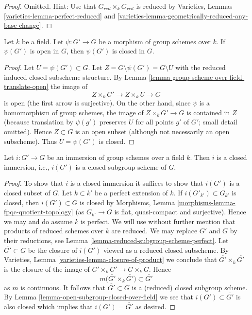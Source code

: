 \begin{proof}
Omitted. Hint: Use that $G_{red} \times_k G_{red}$ is reduced by
Varieties, Lemmas \ref{varieties-lemma-perfect-reduced} and
\ref{varieties-lemma-geometrically-reduced-any-base-change}.
\end{proof}

\begin{lemma}
\label{lemma-open-subgroup-closed-over-field}
Let $k$ be a field. Let $\psi : G' \to G$ be a morphism of group schemes
over $k$. If $\psi(G')$ is open in $G$, then $\psi(G')$ is closed in $G$.
\end{lemma}

\begin{proof}
Let $U = \psi(G') \subset G$. Let $Z = G \setminus \psi(G') = G \setminus U$
with the reduced induced closed subscheme structure. By
Lemma \ref{lemma-group-scheme-over-field-translate-open}
the image of
$$
Z \times_k G' \longrightarrow
Z \times_k U \longrightarrow G
$$
is open (the first arrow is surjective). On the other hand, since $\psi$
is a homomorphism of group schemes, the image of $Z \times_k G' \to G$
is contained in $Z$ (because translation by $\psi(g')$ preserves
$U$ for all points $g'$ of $G'$; small detail omitted).
Hence $Z \subset G$ is an open subset (although not
necessarily an open subscheme). Thus $U = \psi(G')$ is closed.
\end{proof}

\begin{lemma}
\label{lemma-immersion-group-schemes-closed-over-field}
Let $i : G' \to G$ be an immersion of group schemes over a field $k$.
Then $i$ is a closed immersion, i.e., $i(G')$ is a closed subgroup scheme
of $G$.
\end{lemma}

\begin{proof}
To show that $i$ is a closed immersion it suffices to show that
$i(G')$ is a closed subset of $G$. Let $k \subset k'$ be a perfect
extension of $k$. If $i(G'_{k'}) \subset G_{k'}$ is closed, then
$i(G') \subset G$ is closed by
Morphisms, Lemma \ref{morphisms-lemma-fpqc-quotient-topology}
(as $G_{k'} \to G$ is flat, quasi-compact and surjective).
Hence we may and do assume $k$ is perfect. We will use without further
mention that products of reduced schemes over $k$ are reduced.
We may replace $G'$ and $G$ by their reductions, see
Lemma \ref{lemma-reduced-subgroup-scheme-perfect}.
Let $\overline{G'} \subset G$ be the closure of $i(G')$ viewed
as a reduced closed subscheme. By
Varieties, Lemma \ref{varieties-lemma-closure-of-product}
we conclude that $\overline{G'} \times_k \overline{G'}$
is the closure of the image of $G' \times_k G' \to G \times_k G$. Hence
$$
m\Big(\overline{G'} \times_k \overline{G'}\Big)
\subset \overline{G'}
$$
as $m$ is continuous. It follows that $\overline{G'} \subset G$
is a (reduced) closed subgroup scheme. By
Lemma \ref{lemma-open-subgroup-closed-over-field}
we see that $i(G') \subset \overline{G'}$ is also closed
which implies that $i(G') = \overline{G'}$ as desired.
\end{proof}

